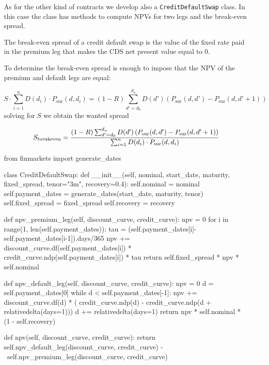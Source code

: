 \begin{finmarkets}
As for the other kind of contracts we develop also a \texttt{CreditDefaultSwap} class. In this case the class has methods to compute NPVs for two legs and the break-even spread.

The break-even spread of a credit default swap is the value of the fixed rate paid in the premium leg that makes the CDS net present value equal to 0.

To determine the break-even spread is enough to impose that the NPV of the premium and default legs are equal:

\begin{equation}
S \cdot\sum_{i=1}^{n} D(d_i) \cdot P_{\textrm{sur}}(d, d_i)
= (1-R) \sum_{d'=d_0}^{d_n} D(d') \left( P_{\textrm{sur}}(d, d') - P_{\textrm{sur}}(d, d'+1) \right)
\end{equation}
solving for $S$ we obtain the wanted spread

\begin{equation}
S_{\mathrm{breakeven}} = \cfrac{(1-R) \sum_{d'=d_0}^{d_n} D(d') \left( P_{\textrm{sur}}(d, d') - P_{\textrm{sur}}(d, d'+1) \right)}{\sum_{i=1}^{n} D(d_i) \cdot P_{\textrm{sur}}(d, d_i)}
\end{equation}
\end{finmarkets}

\begin{ipython}
from finmarkets import generate_dates

class CreditDefaultSwap:
    def __init__(self, nominal, start_date, maturity, fixed_spread,
                 tenor="3m", recovery=0.4):
        self.nominal = nominal
        self.payment_dates = generate_dates(start_date, maturity, tenor)
        self.fixed_spread = fixed_spread
        self.recovery = recovery

    def npv_premium_leg(self, discount_curve, credit_curve):
        npv = 0
        for i in range(1, len(self.payment_dates)):
            tau = (self.payment_dates[i]-self.payment_dates[i-1]).days/365
            npv += discount_curve.df(self.payment_dates[i]) *
                   credit_curve.ndp(self.payment_dates[i]) * tau
        return self.fixed_spread * npv * self.nominal

    def npv_default_leg(self, discount_curve, credit_curve):
        npv = 0
        d = self.payment_dates[0]
        while d < self.payment_dates[-1]:
            npv += discount_curve.df(d) * (
                   credit_curve.ndp(d) -
                   credit_curve.ndp(d + relativedelta(days=1)))
            d += relativedelta(days=1)
        return npv * self.nominal * (1 - self.recovery)

    def npv(self, discount_curve, credit_curve):
        return self.npv_default_leg(discount_curve, credit_curve) - \
               self.npv_premium_leg(discount_curve, credit_curve)
\end{ipython}

